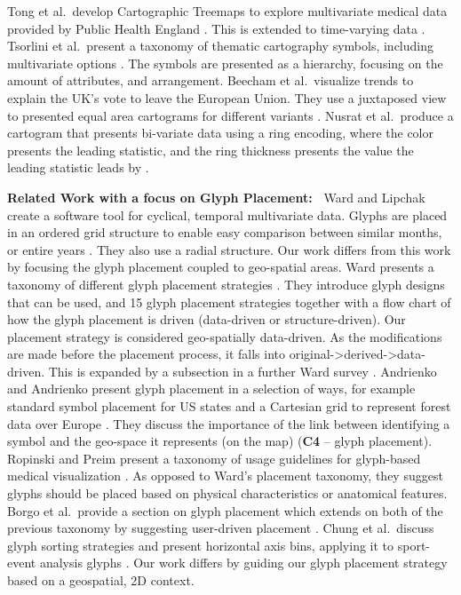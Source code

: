 Tong et al.\ develop Cartographic Treemaps to explore multivariate medical data provided by Public Health England \cite{tong2017cartographic}. This is extended to time-varying data \cite{tong2017time}. 
Tsorlini et al.\ present a taxonomy of thematic cartography symbols, including multivariate options \cite{tsorlini2017designing}. The symbols are presented as a hierarchy, focusing on the amount of attributes, and arrangement.
Beecham et al.\ visualize trends to explain the UK's vote to leave the European Union. They use a juxtaposed view to presented equal area cartograms for different variants \cite{beecham2018locally}. 
Nusrat et al.\ produce a cartogram that presents bi-variate data using a ring encoding, where the color presents the leading statistic, and the ring thickness presents the value the leading statistic leads by \cite{nusrat2018cartogram}. 


\textbf{ Related Work with a focus on Glyph Placement:~} 
Ward and Lipchak create a software tool for cyclical, temporal multivariate data. Glyphs are placed in an ordered grid structure to enable easy comparison between similar months, or entire years \cite{ward2000visualization}. They also use a radial structure. Our work differs from this work by focusing the glyph placement coupled to geo-spatial areas. 
Ward presents a taxonomy of different glyph placement strategies \cite{ward2002taxonomy}. They introduce  glyph designs that can be used, and 15 glyph placement strategies together with a flow chart of how the glyph placement is driven (data-driven or structure-driven). Our placement strategy is considered geo-spatially data-driven. As the modifications are made before the placement process, it falls into original->derived->data-driven. This is expanded by a subsection in a further Ward survey \cite{ward2008multivariate}.
Andrienko and Andrienko present glyph placement in a selection of ways, for example standard symbol placement for US states and a Cartesian grid to represent forest data over Europe \cite{andrienko2006exploratory}. They discuss the importance of the link between identifying a symbol and the geo-space it represents (on the map) (\textbf{C4} -- glyph placement).
Ropinski and Preim present a taxonomy of usage guidelines for glyph-based medical visualization \cite{ropinski2008taxonomy}. As opposed to Ward's placement taxonomy, they suggest glyphs should be placed based on physical characteristics or anatomical features.
Borgo et al.\ provide a section on glyph placement which extends on both of the previous taxonomy by suggesting user-driven placement \cite{borgo2013glyph}.
Chung et al.\ discuss glyph sorting strategies and present horizontal axis bins, applying it to sport-event analysis glyphs \cite{chung2015glyph}. Our work differs by guiding our glyph placement strategy based on a geospatial, 2D context.

